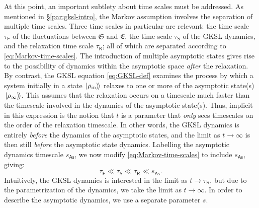 \documentclass[preprints,article,accept,moreauthors,pdftex]{Definitions/mdpi}
\begin{document}
\begin{paracol}{2}
At this point, an important subtlety about time scales must be addressed. As mentioned in \S\ref{par:gksl-intro}, the Markov assumption involves the separation of multiple time scales. Three time scales in particular are relevant: the time scale $\tau_{\mathsf{F}}$ of the fluctuations between $\mathfrak{S}$ and $\mathfrak{E}$, the time scale $\tau_{\mathsf{S}}$ of the GKSL dynamics, and the relaxation time scale $\tau_{\mathsf{R}}$; all of which are separated according to \eqref{eq:Markov-time-scales}. The introduction of multiple asymptotic states gives rise to the possibility of dynamics within the asymptotic space \emph{after} the relaxation. By contrast, the GKSL equation \eqref{eq:GKSL-def} examines the process by which a system initially in a state $\left.\ket{\rho_{\mathrm{in}}}\!\right\rangle$ relaxes to one or more of the asymptotic state(s) $\left.\ket{\rho_{\infty}}\!\right\rangle$. This assumes that the relaxation occurs on a timescale much faster than the timescale involved in the dynamics of the asymptotic state(s). Thus, implicit in this expression is the notion that $t$ is a parameter that \emph{only} sees timescales on the order of the relaxation timescale. In other words, the GKSL dynamics is entirely \emph{before} the dynamics of the asymptotic states, and the limit as $t \rightarrow \infty$ is then still \emph{before} the asymptotic state dynamics. Labelling the asymptotic dynamics timescale $s_{\mathsf{As}}$, we now modify \eqref{eq:Markov-time-scales} to include $s_{\mathsf{As}}$, giving:
\begin{equation}
    \label{eq:multiplte-As-Markov-time-scales}
    \tau_{\mathsf{F}} \ll \tau_{\mathsf{S}} \ll \tau_{\mathsf{R}} \ll s_{\mathsf{As}}.
\end{equation}
Intuitively, the GKSL dynamics is interested in the limit as $t \rightarrow \tau_{\mathsf{R}}$, but due to the parametrization of the dynamics, we take the limit as $t \rightarrow \infty.$ In order to describe the asymptotic dynamics, we use a separate parameter $s$.


\end{paracol}
\end{document}
